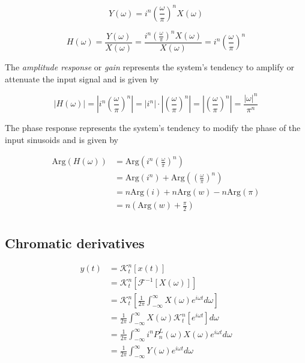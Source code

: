 \documentclass[11pt]{article}
\theoremstyle{plain}
\theoremstyle{definition}
\theoremstyle{remark}
\begin{document}
\begin{equation*}
	Y(\omega) = i^n \left(\frac{\omega}{\pi}\right)^n X(\omega)
\end{equation*}

\begin{equation*}
	H(\omega) = \frac{Y(\omega)}{X(\omega)} = \frac{i^n \left(\frac{\omega}{\pi}\right)^n X(\omega)}{X(\omega)} = i^n \left(\frac{\omega}{\pi}\right)^n
\end{equation*}

The \emph{amplitude response} or \emph{gain} represents the system's tendency to amplify or attenuate the input signal and is given by

\begin{equation*}
	|H(\omega)| = \left|i^n \left(\frac{\omega}{\pi}\right)^n\right| 
							= |i^n| \cdot \left|\left(\frac{\omega}{\pi}\right)^n\right| 
							= \left|\left(\frac{\omega}{\pi}\right)^n\right|
							= \frac{|\omega|^n}{\pi^n}
\end{equation*}

The phase response represents the system's tendency to modify the phase of the input sinusoids and is given by

\begin{align*}
	\mathrm{Arg}(H(\omega)) &= \mathrm{Arg}(i^n \left(\frac{\omega}{\pi}\right)^n) \\
													&= \mathrm{Arg}(i^n) + \mathrm{Arg}(\left(\frac{\omega}{\pi}\right)^n) \\
													&= n\mathrm{Arg}(i) + n\mathrm{Arg}(w) - n\mathrm{Arg}(\pi) \\
													&= n\left ( \mathrm{Arg}(w) + \frac{\pi}{2} \right )\\
\end{align*}

\subsection{Chromatic derivatives}

\begin{align*}
	y(t) &= \mathcal{K}_t^n[x(t)] \\
			 &= \mathcal{K}_t^n[\mathcal{F}^{-1}[X(\omega)]] \\
			 &= \mathcal{K}_t^n \left [ \frac{1}{2 \pi} \int_{-\infty}^{\infty} X(\omega) e^{i \omega t} d\omega \right ] \\
			 &= \frac{1}{2 \pi} \int_{-\infty}^{\infty} X(\omega) \mathcal{K}_t^n[e^{i \omega t}] d\omega \\
			 &= \frac{1}{2 \pi} \int_{-\infty}^{\infty} i^n P_n^L(\omega) X(\omega) e^{i\omega t} d\omega \\
			 &= \frac{1}{2 \pi} \int_{-\infty}^{\infty} Y(\omega) e^{i\omega t} d\omega
\end{align*}
\end{document}

